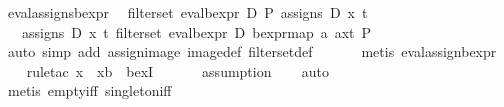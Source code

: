 \begin{isabellebody}
%
\isadelimproof
\isanewline
%
\endisadelimproof
{}\isamarkupfalse%
\ eval{}assigns{}{}bexpr{}\isanewline
\ \ {}filter{}set\ {}eval{}bexpr\ D\ P{}\ {}assigns\ D\ x\ t\ {}{}\ {}\isanewline
\ \ \ assigns\ D\ x\ t\ {}filter{}set\ {}eval{}bexpr\ D\ {}bexpr{}map\ {}{}a{}\ a{}x{}t{}{}\ P{}{}\ {}{}{}\isanewline
%
\isadelimproof
\ \ %
\endisadelimproof
%
\isatagproof
{}\isamarkupfalse%
\ {}auto\ simp\ add{}\ assign{}image\ image{}def\ filter{}set{}def{}\isanewline
\ \ \isamarkupfalse%
\isanewline
\ \ \isamarkupfalse%
\ {}metis\ eval{}assign{}{}bexpr{}\isanewline
\ \ \isamarkupfalse%
\ {}rule{}tac\ x\ {}\ xb\ \ bexI{}\isanewline
\ \ \isamarkupfalse%
\isanewline
\ \ \isamarkupfalse%
\ assumption\isanewline
\ \ \isamarkupfalse%
\ auto\isanewline
\ \ \isamarkupfalse%
\ {}metis\ empty{}iff\ singleton{}iff{}\isanewline

\end{isabellebody}
